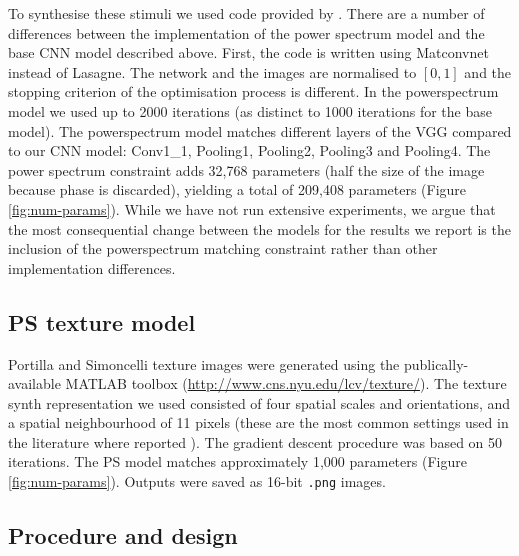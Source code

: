 \documentclass[article, 11pt,a4paper,natbib]{apa6}\usepackage[]{graphicx}\usepackage[]{color}
\begin{document}
To synthesise these stimuli we used code provided by \citet{liu_texture_2016}.
There are a number of differences between the implementation of the power spectrum model and the base CNN model described above. 
First, the code is written using Matconvnet instead of Lasagne. 
The network and the images are normalised to $[0,1]$ and the stopping criterion of the optimisation process is different.
In the powerspectrum model we used up to 2000 iterations (as distinct to 1000 iterations for the base model). 
The powerspectrum model matches different layers of the VGG compared to our CNN model: Conv1\_1, Pooling1, Pooling2, Pooling3 and Pooling4.
The power spectrum constraint adds 32,768 parameters (half the size of the image because phase is discarded), yielding a total of 209,408 parameters (Figure \ref{fig:num-params}).
While we have not run extensive experiments, we argue that the most consequential change between the models for the results we report is the inclusion of the powerspectrum matching constraint rather than other implementation differences.

\subsection{PS texture model}

Portilla and Simoncelli \citep[PS][]{portilla_parametric_2000} texture images were generated using the publically-available MATLAB toolbox (\url{http://www.cns.nyu.edu/lcv/texture/}). 
The texture synth representation we used consisted of four spatial scales and orientations, and a spatial neighbourhood of 11 pixels (these are the most common settings used in the literature where reported \citep[e.g.][]{freeman_metamers_2011, balas_summary-statistic_2009}).
The gradient descent procedure was based on 50 iterations.
The PS model matches approximately 1,000 parameters (Figure \ref{fig:num-params}).
Outputs were saved as 16-bit \texttt{.png} images.

\subsection{Procedure and design}
\end{document}
